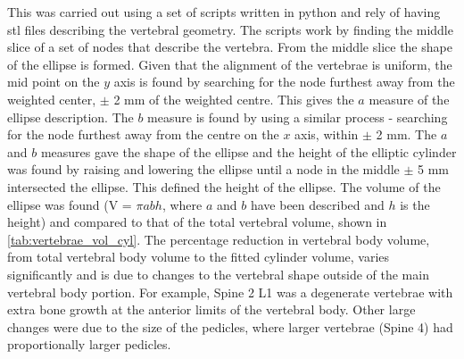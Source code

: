 This was carried out using a set of scripts written in python and rely of having stl files describing the vertebral geometry.
The scripts work by finding the middle slice of a set of nodes that describe the vertebra.
From the middle slice the shape of the ellipse is formed.
Given that the alignment of the vertebrae is uniform, the mid point on the $y$ axis is found by searching for the node furthest away from the weighted center, $\pm$ 2 mm of the weighted centre.
This gives the $a$ measure of the ellipse description.
The $b$ measure is found by using a similar process - searching for the node furthest away from the centre on the $x$ axis, within $\pm$ 2 mm.
The $a$ and $b$ measures gave the shape of the ellipse and the height of the elliptic cylinder was found by raising and lowering the ellipse until a node in the middle $\pm$ 5 mm intersected the ellipse.
This defined the height of the ellipse.
The volume of the ellipse was found (V = $\pi a b h$, where $a$ and $b$ have been described and $h$ is the height) and compared to that of the total vertebral volume, shown in \cref{tab:vertebrae_vol_cyl}.
The percentage reduction in vertebral body volume, from total vertebral body volume to the fitted cylinder volume, varies significantly and is due to changes to the vertebral shape outside of the main vertebral body portion.
For example, Spine 2 L1 was a degenerate vertebrae with extra bone growth at the anterior limits of the vertebral body.
Other large changes were due to the size of the pedicles, where larger vertebrae (Spine 4) had proportionally larger pedicles.

